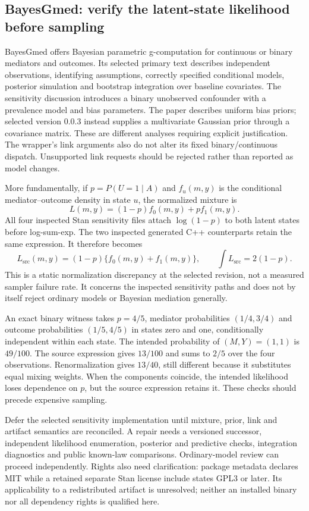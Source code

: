 \subsection{BayesGmed: verify the latent-state likelihood before sampling}

BayesGmed offers Bayesian parametric g-computation for continuous or binary
mediators and outcomes. Its selected primary text describes independent
observations, identifying assumptions, correctly specified conditional models,
posterior simulation and bootstrap integration over baseline covariates.
The sensitivity discussion introduces a binary unobserved confounder with a
prevalence model and bias parameters. The paper describes uniform bias priors;
selected version 0.0.3 instead supplies a multivariate Gaussian prior through a
covariance matrix. These are different analyses requiring explicit justification.
The wrapper's link arguments also do not alter its fixed binary/continuous
dispatch. Unsupported link requests should be rejected rather than reported
as model changes. \citep{exec25_rmed_yimer_paper,exec25_rmed_bayesgmed}

More fundamentally, if $p=P(U=1\mid A)$ and $f_u(m,y)$ is the conditional
mediator--outcome density in state $u$, the normalized mixture is
\[
 L(m,y)=(1-p)f_0(m,y)+p f_1(m,y).
\]
All four inspected Stan sensitivity files attach $\log(1-p)$ to both latent
states before log-sum-exp. The two inspected generated C++ counterparts retain
the same expression. It therefore becomes
\[
 L_{\mathrm{src}}(m,y)=(1-p)\{f_0(m,y)+f_1(m,y)\},
 \qquad \int L_{\mathrm{src}}=2(1-p).
\]
This is a static normalization discrepancy at the selected revision, not a
measured sampler failure rate. It concerns the inspected sensitivity paths
and does not by itself reject ordinary models or Bayesian mediation generally.
\citep{exec25_rmed_bayesgmed}

An exact binary witness takes $p=4/5$, mediator probabilities $(1/4,3/4)$ and
outcome probabilities $(1/5,4/5)$ in states zero and one, conditionally
independent within each state. The intended probability of $(M,Y)=(1,1)$ is
$49/100$. The source expression gives $13/100$ and sums to $2/5$ over the
four observations. Renormalization gives $13/40$, still different because it
substitutes equal mixing weights. When the components coincide, the intended
likelihood loses dependence on $p$, but the source expression retains it.
These checks should precede expensive sampling. \citep{exec25_rmed_choice}

Defer the selected sensitivity implementation until mixture, prior, link and
artifact semantics are reconciled. A repair needs a versioned successor,
independent likelihood enumeration, posterior and predictive checks,
integration diagnostics and public known-law comparisons. Ordinary-model
review can proceed independently. Rights also need clarification: package
metadata declares MIT while a retained separate Stan license include states
GPL3 or later. Its applicability to a redistributed artifact is unresolved;
neither an installed binary nor all dependency rights is qualified here.
\citep{exec25_rmed_bayesgmed,exec25_rmed_choice}

